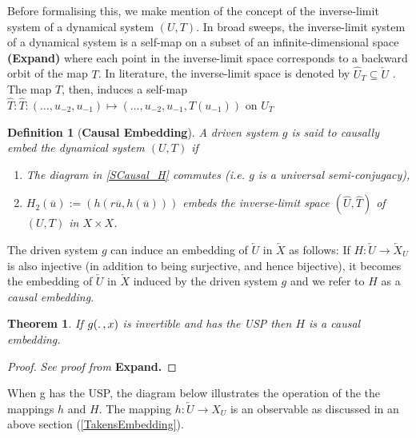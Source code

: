 \documentclass[12 pt]{article}
\newtheorem{Definition}{Definition}[]
\newtheorem{Theorem}{Theorem}[]
\begin{document}
  Before formalising this, we make mention of the concept of the inverse-limit system of a dynamical system $(U,T)$. 
  In broad sweeps, the inverse-limit system of a dynamical system is a self-map on a subset of an infinite-dimensional space \textbf{(Expand)} where each point in the inverse-limit space corresponds to a backward orbit of the map $T$. In literature, the inverse-limit space is denoted by $\hat{U}_T\subseteq\overleftarrow{U}$ \cite{manjunath2021universal}. 
  The map $T$, then, induces a self-map $\hat{T}:\widehat{T}: (\ldots,u_{-2},u_{-1}) \mapsto  (\ldots,u_{-2},u_{-1},T(u_{-1}))$ on $\widehat{U}_T$

\begin{Definition}
  [\bf Causal Embedding]\label{Dfn_CausalEmbed}
  A driven system $g$ is said to causally embed the dynamical system $(U,T)$ if 
  \vspace{-8mm}
\begin{enumerate}[noitemsep, label=\roman*.]
  \item The diagram in \ref{SCausal_H} commutes (i.e. $g$ is a universal semi-conjugacy),
  \item $H_2(\overline{u}):=(h(r\overline{u}, h(\overline{u})))$ embeds the inverse-limit space $(\hat{U}, \hat{T})$ of $(U,T)$ in $X\times{X}$.
\end{enumerate}
\end{Definition}

The driven system $g$ can induce an embedding of $\overleftarrow{U}$ in $\overleftarrow{X}$ as follows: If $H:\overleftarrow{U}\to\overleftarrow{X}_U$ is also injective (in addition to being surjective, and hence bijective), it becomes the embedding of $\overleftarrow{U}$ in $\overleftarrow{X}$ induced by the driven system $g$ and we refer to $H$ as a \emph{causal embedding}. 

\begin{Theorem}
 If $g(\ldotp,x)$ is invertible and has the USP then $H$ is a causal embedding. 
\end{Theorem}
\begin{proof}
  \emph{See proof from \cite{manjunath2021universal}}  \textbf{Expand.}
\end{proof}

When g has the USP, the diagram below illustrates the operation of the the mappings $h$ and $H$. The mapping $h:\overleftarrow{U}\to{X_U}$ is an observable as discussed in an above section (\ref{TakensEmbedding}).  
\end{document}
